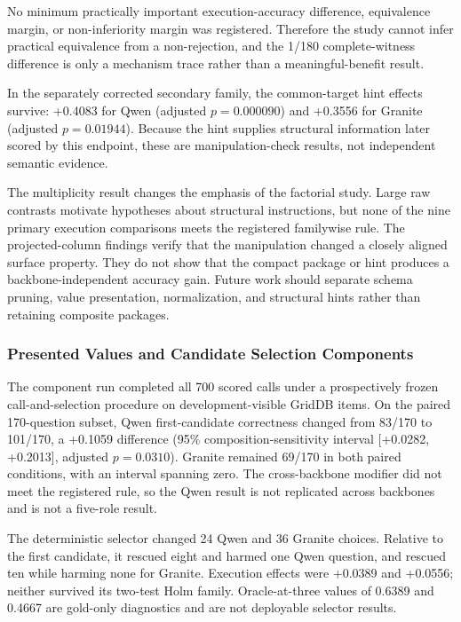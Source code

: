 \documentclass[applsci,article,submit,moreauthors]{Definitions/mdpi}
\begin{document}
No minimum practically important execution-accuracy difference, equivalence margin, or non-inferiority margin was registered. Therefore the study cannot infer practical equivalence from a non-rejection, and the 1/180 complete-witness difference is only a mechanism trace rather than a meaningful-benefit result.

In the separately corrected secondary family, the common-target hint effects survive: +0.4083 for Qwen (adjusted $p=0.000090$) and +0.3556 for Granite (adjusted $p=0.01944$). Because the hint supplies structural information later scored by this endpoint, these are manipulation-check results, not independent semantic evidence.

The multiplicity result changes the emphasis of the factorial study. Large raw contrasts motivate hypotheses about structural instructions, but none of the nine primary execution comparisons meets the registered familywise rule. The projected-column findings verify that the manipulation changed a closely aligned surface property. They do not show that the compact package or hint produces a backbone-independent accuracy gain. Future work should separate schema pruning, value presentation, normalization, and structural hints rather than retaining composite packages.

\subsubsection{Presented Values and Candidate Selection Components}

The component run completed all 700 scored calls under a prospectively frozen call-and-selection procedure on development-visible GridDB items. On the paired 170-question subset, Qwen first-candidate correctness changed from 83/170 to 101/170, a +0.1059 difference (95\% composition-sensitivity interval [+0.0282, +0.2013], adjusted $p=0.0310$). Granite remained 69/170 in both paired conditions, with an interval spanning zero. The cross-backbone modifier did not meet the registered rule, so the Qwen result is not replicated across backbones and is not a five-role result.

The deterministic selector changed 24 Qwen and 36 Granite choices. Relative to the first candidate, it rescued eight and harmed one Qwen question, and rescued ten while harming none for Granite. Execution effects were +0.0389 and +0.0556; neither survived its two-test Holm family. Oracle-at-three values of 0.6389 and 0.4667 are gold-only diagnostics and are not deployable selector results.
\end{document}

